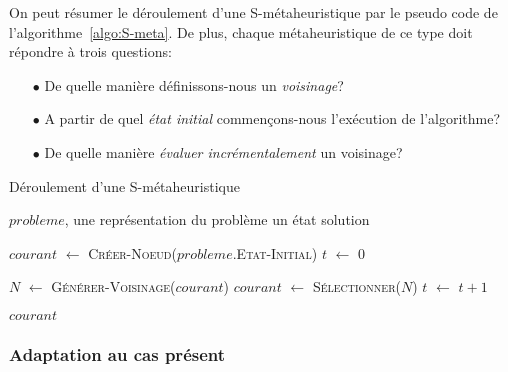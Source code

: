On peut résumer le déroulement d'une S-métaheuristique par le pseudo code de l'algorithme~\ref{algo:S-meta}. De plus, chaque métaheuristique de ce type doit répondre à trois questions: 
\begin{itemize}
	\item[$\bullet$] De quelle manière définissons-nous un \emph{voisinage}?
	\item[$\bullet$] A partir de quel \emph{état initial} commençons-nous l'exécution de l'algorithme?
	\item[$\bullet$] De quelle manière \emph{évaluer incrémentalement} un voisinage?
\end{itemize}

\begin{algorithm}
	\caption{Déroulement d'une S-métaheuristique}
	\label{algo:S-meta}
	\begin{algorithmic}[1]
		\REQUIRE $probleme$, une représentation du problème
		\ENSURE un état solution
		
		\STATE $courant$ $\leftarrow$ \textsc{Créer-Noeud}($probleme$.\textsc{Etat-Initial})
		\STATE $t$ $\leftarrow$ 0
		
			\STATE $N$ $\leftarrow$ \textsc{Générer-Voisinage}($courant$)
			\STATE $courant$ $\leftarrow$ \textsc{Sélectionner}($N$)
			\STATE $t$ $ \leftarrow$ $t+1$
		\ENDWHILE
		
		\RETURN $courant$
\end{algorithmic}
\end{algorithm}
\subsubsection{Adaptation au cas présent}

